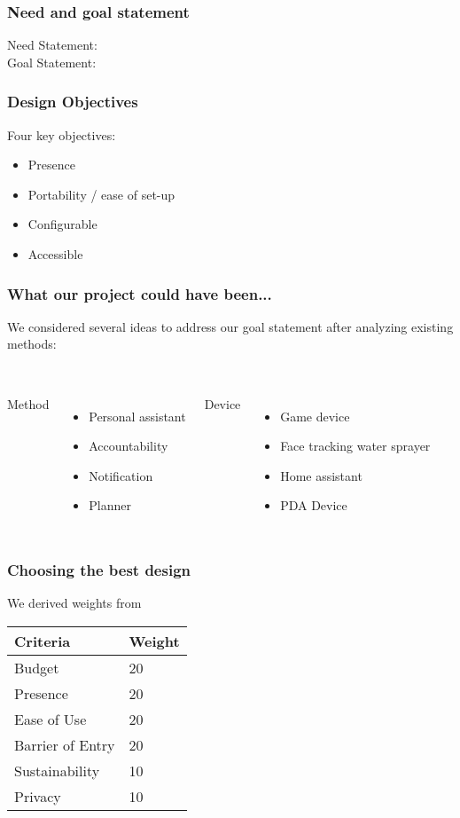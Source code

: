 \documentclass{beamer}
\begin{document}
\frame{\titlepage}

\begin{frame}
  \frametitle{Need and goal statement}
  Need Statement:
   \\
  Goal Statement:
   \\
\end{frame}

\begin{frame}
  \frametitle{Design Objectives}
  Four key objectives:
  \begin{itemize}
    \item Presence
    \item Portability / ease of set-up
    \item Configurable
    \item Accessible
  \end{itemize}
\end{frame}

\begin{frame}
  \frametitle{What our project could have been...}
  We considered several ideas to address our goal statement after analyzing existing methods:
  \\~\\
  \begin{columns}
    Method
    \begin{itemize}
      \item Personal assistant
      \item Accountability
      \item Notification
      \item Planner
    \end{itemize}

    Device
    \begin{itemize}
      \item Game device
      \item Face tracking water sprayer
      \item Home assistant
      \item PDA Device
    \end{itemize}

  \end{columns}
\end{frame}

\begin{frame}
  \frametitle{Choosing the best design}
  We derived weights from
  \begin{longtable}[]{@{}ll@{}}
  \toprule
  Criteria & Weight \\
  \midrule
  \endhead
  Budget & 20 \\
  Presence & 20 \\
  Ease of Use & 20 \\
  Barrier of Entry & 20 \\
  Sustainability & 10 \\
  Privacy & 10 \\
  \bottomrule
  \end{longtable}
\end{frame}
\end{document}
